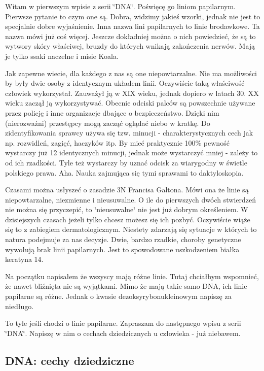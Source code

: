 Witam w pierwszym wpisie z serii \char`\"{}\-D\-N\-A\char`\"{}. Poświęcę go liniom papilarnym. Pierwsze pytanie to czym one są. Dobra, widzimy jakieś wzorki, jednak nie jest to specjalnie dobre wyjaśnienie. Inna nazwa lini papilarnych to linie brodawkowe. Ta nazwa mówi już coś więcej. Jeszcze dokładniej można o nich powiedzieć, że są to wytwory skóry właściwej, bruzdy do których wnikają zakończenia nerwów. Mają je tylko ssaki naczelne i misie Koala.

Jak zapewne wiecie, dla każdego z nas są one niepowtarzalne. Nie ma możliwości by były dwie osoby z identycznym układem linii. Oczywiście taką właściwość człowiek wykorzystał. Zauważył ją w X\-I\-X wieku, jednak dopiero w latach 30. X\-X wieku zaczął ją wykorzystywać. Obecnie odciski palców są powszechnie używane przez policję i inne organizacje dbające o bezpieczeństwo. Dzięki nim (nierozważni) przestępcy mogą zacząć oglądać niebo w kratkę. Do zidentyfikowania sprawcy używa się tzw. minucji -\/ charakterystycznych cech jak np. rozwidleń, zagięć, haczyków itp. By mieć praktycznie 100\% pewność wystarczy już 12 identycznych minucji, jednak może wystarczyć mniej -\/ zależy to od ich rzadkości. Tyle też wystarczy by uznać odcisk za wiarygodny w świetle polskiego prawa. Aha. Nauka zajmująca się tymi sprawami to daktyloskopia.

Czasami można usłyszeć o zasadzie 3\-N Francisa Galtona. Mówi ona że linie są niepowtarzalne, niezmienne i nieusuwalne. O ile do pierwszych dwóch stwierdzeń nie można się przyczepić, to \char`\"{}nieusuwalne\char`\"{} nie jest już dobrym określeniem. W dzisiejszych czasach jeżeli tylko chcesz możesz się ich pozbyć. Oczywiście wiąże się to z zabiegiem dermatologicznym. Niestety zdarzają się sytuacje w których to natura podejmuje za nas decyzje. Dwie, bardzo rzadkie, choroby genetyczne wywołują brak linii papilarnych. Jest to spowodowane uszkodzeniem białka keratyna 14.

Na początku napisałem że wszyscy mają różne linie. Tutaj chciałbym wspomnieć, że nawet bliźnięta nie są wyjątkami. Mimo że mają takie samo D\-N\-A, ich linie papilarne są różne. Jednak o kwasie dezoksyrybonukleinowym napiszę za niedługo.

To tyle jeśli chodzi o linie papilarne. Zapraszam do następnego wpisu z serii \char`\"{}\-D\-N\-A\char`\"{}. Napiszę w nim o cechach dziedzicznych u człowieka -\/ już niebawem.

\subsection*{D\-N\-A\-: cechy dziedziczne}

